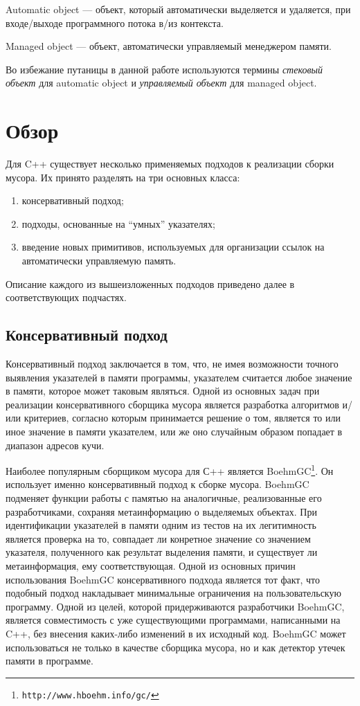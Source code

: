 Automatic object --- объект, который автоматически выделяется и удаляется, при входе/выходе программного потока в/из контекста.

Managed object --- объект, автоматически управляемый менеджером памяти.

Во избежание путаницы в данной работе используются термины \textit{стековый объект} для automatic object
и \textit{управляемый объект} для managed object.

\section{Обзор}

Для C++ существует несколько применяемых подходов к реализации сборки мусора.
Их принято разделять на три основных класса\cite{CppArt}:
\begin{enumerate}
\item консервативный подход;
\item подходы, основанные на ``умных'' указателях;
\item введение новых примитивов, используемых для организации ссылок на автоматически управляемую память.
\end{enumerate}
Описание каждого из вышеизложенных подходов приведено далее в соответствующих подчастях.

\subsection{Консервативный подход}
Консервативный подход заключается в том, что, не имея возможности точного выявления указателей в памяти программы,
указателем считается любое значение в памяти, которое может таковым являться.
Одной из основных задач при реализации консервативного сборщика мусора является разработка алгоритмов
и/или критериев, согласно которым принимается решение о том, является то или иное значение в памяти указателем,
или же оно случайным образом попадает в диапазон адресов кучи.

Наиболее популярным сборщиком мусора для С++ является BoehmGC\footnote{\texttt{http://www.hboehm.info/gc/}}.
Он использует именно консервативный подход к сборке мусора.
BoehmGC подменяет функции работы с памятью на аналогичные, реализованные его разработчиками,
сохраняя метаинформацию о выделяемых объектах.
При идентификации указателей в памяти одним из тестов на их легитимность является проверка
на то, совпадает ли конретное значение со значением указателя, полученного как результат
выделения памяти, и существует ли метаинформация, ему соответствующая.
Одной из основных причин использования BoehmGC консервативного подхода является тот факт,
что подобный подход накладывает минимальные ограничения на пользовательскую программу.
Одной из целей, которой придерживаются разработчики BoehmGC, является совместимость с уже существующими
программами, написанными на C++, без внесения каких-либо изменений в их исходный код\cite{BoehmTransGC}.
BoehmGC может использоваться не только в качестве сборщика мусора, но и как детектор утечек памяти в программе.

